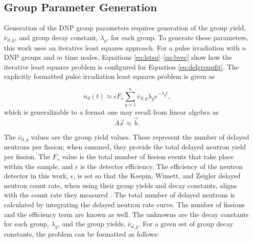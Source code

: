 \documentclass{style/nseJournal}
\begin{document}


\subsection{Group Parameter Generation}
\label{sec:group-param}

Generation of the DNP group parameters requires generation of the group yield, $\bar{\nu}_{d, g}$, and group decay constant, $\lambda_g$, for each group.
To generate these parameters, this work uses an iterative least squares approach.
For a pulse irradiation with $n$ DNP groups and $m$ time nodes, Equations \eqref{eq:lstsq}--\eqref{eq:bvec} show how the iterative least squares problem is configured for Equation \eqref{eq:delgroupfit}.
The explicitly formatted pulse irradiation least squares problem is given as

\begin{equation}
\dot{n}_d(t) \approx \epsilon F_s \sum_{g=1}^{n}  \bar{\nu}_{d, g} \lambda_g e^{-\lambda_g t},
\label{eq:delgroupfit}
\end{equation}
which is generalizable to a format one may recall from linear algebra as
\begin{equation}
A \vec{x} \approx \vec{b}.
\label{eq:lstsq}
\end{equation}

The $\bar{\nu}_{d, g}$ values are the group yield values. These represent the number of delayed neutrons per fission; when summed, they provide the total delayed neutron yield per fission. The $F_s$ value is the total number of fission events that take place within the sample, and $\epsilon$ is the detector efficiency. 
The efficiency of the neutron detector in this work, $\epsilon$, is set so that the Keepin, Wimett, and Zeigler delayed neutron count rate, when using their group yields and decay constants, aligns with the count rate they measured \cite{KEEPIN1957IN2}.
The total number of delayed neutrons is calculated by integrating the delayed neutron rate curve.
The number of fissions and the efficiency term are known as well. The unknowns are the decay constants for each group, $\lambda_g$, and the group yields, $\bar{\nu}_{d, g}$. 
For a given set of group decay constants, the problem can be formatted as follows:
\end{document}

